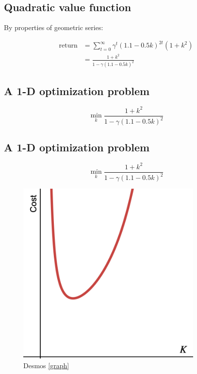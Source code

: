 \documentclass[
  letterpaper,
  DIV=11,
  numbers=noendperiod,
  oneside]{scrartcl}
\begin{document}
\subsection{Quadratic value function}\label{quadratic-value-function}

By properties of geometric series:

\begin{align}
\text{return} &= \sum_{t=0}^{\infty} \gamma^t (1.1-0.5 k)^{2t} (1 +  k^2) \\
&= \frac{1 +  k^2}{1 - \gamma\left(1.1 - 0.5 k\right)^2} 
\end{align}


\subsection{A 1-D optimization
problem}\label{a-1-d-optimization-problem}

\[\min_{k} \frac{1 +  k^2}{1 - \gamma\left(1.1 - 0.5 k\right)^2}\]

\subsection{A 1-D optimization
problem}\label{a-1-d-optimization-problem-1}

\[\min_{k} \frac{1 +  k^2}{1 - \gamma\left(1.1 - 0.5 k\right)^2}\]

\begin{figure}[H]

{\centering \includegraphics[width=\textwidth,height=3.64583in]{figs/desmos-controller.png}

}

\caption{Desmos
\href{https://www.desmos.com/calculator/vgnchtuqys}{{[}graph{]}}}

\end{figure}%
\end{document}
